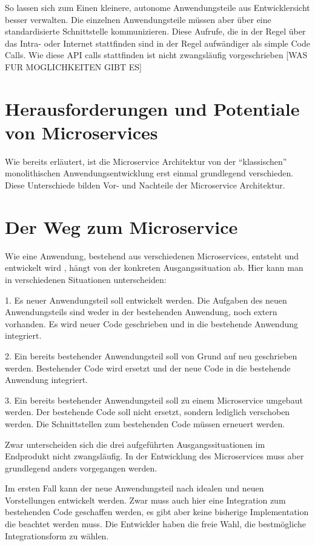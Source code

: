 So lassen sich zum Einen kleinere, autonome Anwendungsteile aus Entwicklersicht besser verwalten. Die einzelnen Anwendungsteile müssen aber über eine standardisierte Schnittstelle kommunizieren. Diese Aufrufe, die in der Regel über das Intra- oder Internet stattfinden sind in der Regel aufwändiger als simple Code Calls. Wie diese API calls stattfinden ist nicht zwangsläufig vorgeschrieben [WAS FUR MOGLICHKEITEN GIBT ES]


\section{Herausforderungen und Potentiale von Microservices}
Wie bereits erläutert, ist die Microservice Architektur von der ``klassischen'' monolithischen Anwendungsentwicklung erst einmal grundlegend verschieden. Diese Unterschiede bilden Vor- und Nachteile der Microservice Architektur.

\section{Der Weg zum Microservice}
Wie eine Anwendung, bestehend aus verschiedenen Microservices, entsteht und entwickelt wird , hängt von der konkreten Ausgangssituation ab. Hier kann man in verschiedenen Situationen unterscheiden:

1. Es neuer Anwendungsteil soll entwickelt werden. Die Aufgaben des neuen Anwendungsteils sind weder in der bestehenden Anwendung, noch extern vorhanden. Es wird neuer Code geschrieben und in die bestehende Anwendung integriert.

2. Ein bereits bestehender Anwendungsteil soll von Grund auf neu geschrieben werden. Bestehender Code wird ersetzt und der neue Code in die bestehende Anwendung integriert.

3. Ein bereits bestehender Anwendungsteil soll zu einem Microservice umgebaut werden. Der bestehende Code soll nicht ersetzt, sondern lediglich verschoben werden. Die Schnittstellen zum bestehenden Code müssen erneuert werden.

Zwar unterscheiden sich die drei aufgeführten Ausgangssituationen im Endprodukt nicht zwangsläufig. In der Entwicklung des Microservices muss aber grundlegend anders vorgegangen werden. 

Im ersten Fall kann der neue Anwendungsteil nach idealen und neuen Vorstellungen entwickelt werden. Zwar muss auch hier eine Integration zum bestehenden Code geschaffen werden, es gibt aber keine bisherige Implementation die beachtet werden muss. Die Entwickler haben die freie Wahl, die bestmögliche Integrationsform zu wählen.

